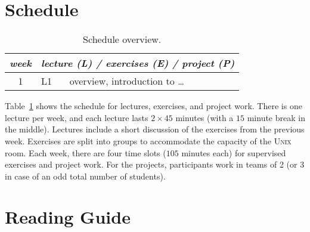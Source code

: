 \documentclass[a4paper]{article}
\begin{document}
\section{Schedule}

\begin{table}
  \centering
  \begin{tabular}{c|ll}
    \emph{week} & \multicolumn{2}{l}{\emph{lecture (L) / exercises (E) / project (P)}} \\
    \hline
    1 &
    L1 &
    overview, introduction to \ldots
    \\
    \hline
  \end{tabular}
  \caption{Schedule overview.}\label{tab:schedule}
\end{table}

Table~\ref{tab:schedule} shows the schedule for lectures, exercises, and project work.
There is one lecture per week, and each lecture lasts $2\times 45$ minutes (with a $15$ minute break in the middle).
Lectures include a short discussion of the exercises from the previous week.
Exercises are split into groups to accommodate the capacity of the \textsc{Unix} room.
Each week, there are four time slots ($105$ minutes each) for supervised exercises and project work.
For the projects, participants work in teams of 2 (or 3 in case of an odd total number of students).



\section{Reading Guide}
\end{document}
